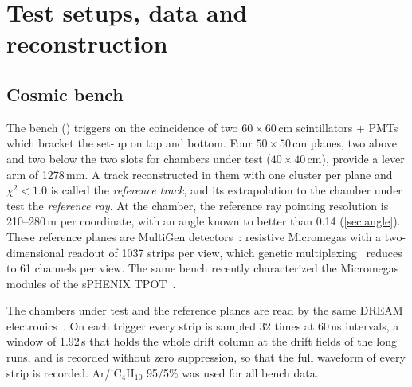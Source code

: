 \section{Test setups, data and reconstruction}\label{sec:setups}

\subsection{Cosmic bench}
The bench () triggers on the coincidence of two $60\times60$\,cm scintillators + PMTs which bracket the set-up on top and bottom. Four
$50\times50$\,cm planes, two above and two below the two slots for chambers under test
($40\times40$\,cm), provide a lever arm of 1278\,mm. A track
reconstructed in them with one cluster per plane and $\chi^2<1.0$ is called the \emph{reference track}, and its
extrapolation to the chamber under test the \emph{reference ray}. At the chamber, the reference ray pointing resolution is 210--280\,\textmu m per coordinate, with an angle known to better than 0.14\textdegree{} (\cref{sec:angle}).
These reference planes are MultiGen detectors~\cite{Bouteille2016MultiGen,Radics2019}: resistive Micromegas with a
two-dimensional readout of 1037 strips per view, which genetic multiplexing~\cite{Procureur2013} reduces to 61 channels
per view. The same bench recently characterized the Micromegas modules of the sPHENIX TPOT~\cite{TPOT2024}.

The chambers under test and the reference planes are read by the same DREAM electronics~\cite{Flouzat2014DREAM,Acker2020MVT}. On each trigger every strip
is sampled 32 times at 60\,ns intervals, a window of 1.92\,\textmu s that holds the whole drift column at the
drift fields of the long runs, and is recorded without zero suppression, so that the full waveform of every strip is recorded. Ar/iC$_4$H$_{10}$ 95/5\% was used for all bench data. 

